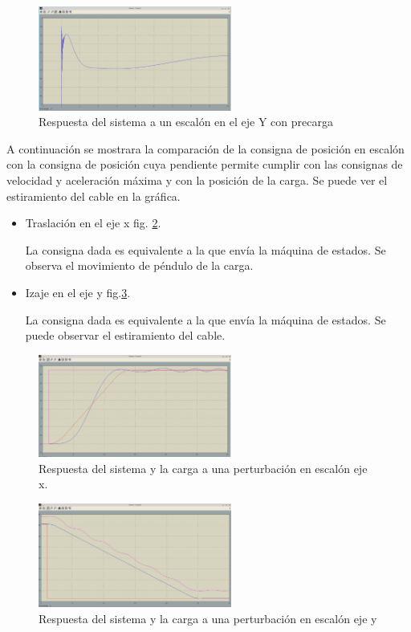 \documentclass[journal]{IEEEtran}
\begin{document}
\begin{figure}[!t]
 \centering
  \includegraphics[width=2.5in]{Controlador_prec_res.jpeg}
  \caption{Respuesta del sistema a un escalón en el eje Y con precarga}
  \label{fig:resyComp}
\end{figure}

A continuación se mostrara la comparación de la consigna de posición en escalón con
la consigna de posición cuya pendiente permite cumplir con las consignas de velocidad
y aceleración máxima y con la posición de la carga. Se puede ver el estiramiento del
cable en la gráfica.
\begin{itemize}
 \item Traslación en el eje x fig. \ref{fig:consposxxl}.
 
 La consigna dada es equivalente a la que envía la máquina de estados. Se observa
 el movimiento de péndulo de la carga.
 \item Izaje en el eje y fig.\ref{fig:consposyyl}.
 
  La consigna dada es equivalente a la que envía la máquina de estados. Se puede 
  observar el estiramiento del cable.
\end{itemize}

\begin{figure}[!t]
 \centering
  \includegraphics[width=2.5in]{consx_posx_xl.jpeg}
  \caption{Respuesta del sistema y la carga a una perturbación en escalón eje x.}
  \label{fig:consposxxl}
\end{figure}

\begin{figure}[!t]
 \centering
  \includegraphics[width=2.5in]{consy_posy_yl.jpeg}
  \caption{Respuesta del sistema y la carga a una perturbación en escalón eje y}
  \label{fig:consposyyl}
\end{figure}
\end{document}
